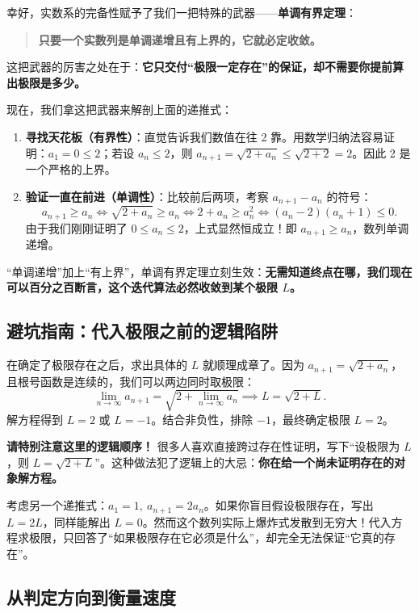 幸好，实数系的完备性赋予了我们一把特殊的武器——\textbf{单调有界定理}：
\begin{quote}
\textbf{只要一个实数列是单调递增且有上界的，它就必定收敛。}
\end{quote}
这把武器的厉害之处在于：\textbf{它只交付``极限一定存在''的保证，却不需要你提前算出极限是多少。}

现在，我们拿这把武器来解剖上面的递推式：
\begin{enumerate}
    \item \textbf{寻找天花板（有界性）}：直觉告诉我们数值在往 2 靠。用数学归纳法容易证明：\(a_1 = 0 \le 2\)；若设 \(a_n \le 2\)，则 \(a_{n+1} = \sqrt{2+a_n} \le \sqrt{2+2} = 2\)。因此 2 是一个严格的上界。
    \item \textbf{验证一直在前进（单调性）}：比较前后两项，考察 \(a_{n+1} - a_n\) 的符号：
    \[
    a_{n+1} \ge a_n \iff \sqrt{2+a_n} \ge a_n \iff 2+a_n \ge a_n^2 \iff (a_n-2)(a_n+1) \le 0.
    \]
    由于我们刚刚证明了 \(0 \le a_n \le 2\)，上式显然恒成立！即 \(a_{n+1} \ge a_n\)，数列单调递增。
\end{enumerate}

``单调递增''加上``有上界''，单调有界定理立刻生效：\textbf{无需知道终点在哪，我们现在可以百分之百断言，这个迭代算法必然收敛到某个极限 \(L\)。}

\subsection{避坑指南：代入极限之前的逻辑陷阱}

在确定了极限存在之后，求出具体的 \(L\) 就顺理成章了。因为 \(a_{n+1} = \sqrt{2+a_n}\)，且根号函数是连续的，我们可以两边同时取极限：
\[
\lim_{n\to\infty} a_{n+1} = \sqrt{2 + \lim_{n\to\infty} a_n} \implies L = \sqrt{2+L}.
\]
解方程得到 \(L=2\) 或 \(L=-1\)。结合非负性，排除 \(-1\)，最终确定极限 \(L=2\)。

\textbf{请特别注意这里的逻辑顺序！} 很多人喜欢直接跨过存在性证明，写下``设极限为 \(L\)，则 \(L=\sqrt{2+L}\)''。这种做法犯了逻辑上的大忌：\textbf{你在给一个尚未证明存在的对象解方程。}

考虑另一个递推式：\(a_1=1,\ a_{n+1}=2a_n\)。如果你盲目假设极限存在，写出 \(L = 2L\)，同样能解出 \(L=0\)。然而这个数列实际上爆炸式发散到无穷大！代入方程求极限，只回答了``如果极限存在它必须是什么''，却完全无法保证``它真的存在''。

\subsection{从判定方向到衡量速度}

